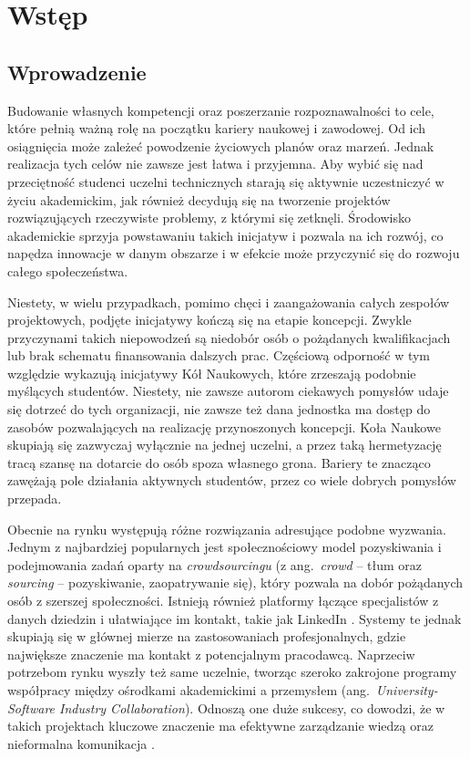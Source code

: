\chapter{Wstęp}
\section{Wprowadzenie}
Budowanie własnych kompetencji oraz poszerzanie rozpoznawalności to cele, które pełnią ważną rolę na początku kariery naukowej i zawodowej. Od ich osiągnięcia może zależeć powodzenie życiowych planów oraz marzeń. Jednak realizacja tych celów nie zawsze jest łatwa i przyjemna. Aby wybić się nad przeciętność studenci uczelni technicznych starają się  aktywnie uczestniczyć w życiu akademickim, jak również decydują się na tworzenie projektów rozwiązujących rzeczywiste problemy, z którymi się zetknęli. Środowisko akademickie sprzyja powstawaniu takich inicjatyw i pozwala na ich rozwój, co napędza innowacje w danym obszarze i w efekcie może przyczynić się do rozwoju całego społeczeństwa. 

Niestety, w wielu przypadkach, pomimo chęci i zaangażowania całych zespołów projektowych, podjęte inicjatywy kończą się na etapie koncepcji. Zwykle przyczynami takich niepowodzeń są niedobór osób o pożądanych kwalifikacjach lub brak schematu finansowania dalszych prac. Częściową odporność w tym względzie wykazują inicjatywy Kół Naukowych, które zrzeszają podobnie myślących studentów. Niestety, nie zawsze autorom ciekawych pomysłów udaje się dotrzeć do tych organizacji, nie zawsze też dana jednostka ma dostęp do zasobów pozwalających na realizację przynoszonych koncepcji.
Koła Naukowe skupiają się zazwyczaj wyłącznie na jednej uczelni, a przez taką hermetyzację tracą szansę na dotarcie do osób spoza własnego grona. Bariery te znacząco zawężają pole działania aktywnych studentów, przez co wiele dobrych pomysłów przepada.

Obecnie na rynku występują różne rozwiązania adresujące podobne wyzwania. Jednym z najbardziej popularnych jest społecznościowy model pozyskiwania i podejmowania zadań oparty na \emph{crowdsourcingu} \cite{Mao2017} (z ang.~\emph{crowd} -- tłum oraz \emph{sourcing} -- pozyskiwanie, zaopatrywanie się), który pozwala na dobór pożądanych osób z szerszej społeczności. 
Istnieją również platformy łączące specjalistów z danych dziedzin i ułatwiające im kontakt, takie jak LinkedIn \cite{Zide2014}. Systemy te jednak skupiają się w głównej mierze na zastosowaniach profesjonalnych, gdzie największe znaczenie ma kontakt z potencjalnym pracodawcą.
Naprzeciw potrzebom rynku wyszły też same uczelnie, tworząc szeroko zakrojone programy współpracy między ośrodkami akademickimi a przemysłem (ang.~\emph{University-Software Industry Collaboration}). Odnoszą one duże sukcesy, co dowodzi, że w takich projektach kluczowe znaczenie ma efektywne zarządzanie wiedzą oraz nieformalna komunikacja \cite{Wohlin2012}. 

